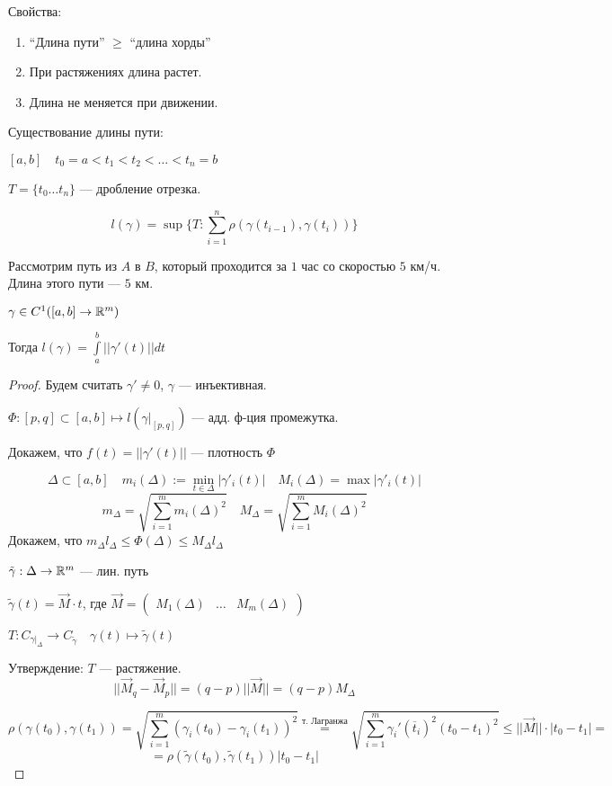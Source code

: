 Свойства:
\begin{enumerate}
    \item ``Длина пути'' $\geq$ ``длина хорды''
    \item При растяжениях длина растет.
    \item Длина не меняется при движении.
\end{enumerate}

Существование длины пути:

$[a,b] \quad t_0=a<t_1<t_2<\ldots<t_n=b$

$T=\{t_0\ldots t_n\}$ --- дробление отрезка.

$$l(\gamma)=\sup\{T : \sum\limits_{i=1}^n \rho(\gamma(t_{i-1}), \gamma(t_i))\}$$

\begin{example}
    Рассмотрим путь из $A$ в $B$, который проходится за $1$ час со скоростью $5$ км/ч. Длина этого пути --- $5$ км.
\end{example}

\begin{theorem}
    $\gamma\in C^1([a,b]\to\mathbb{R}^m)$

    Тогда $l(\gamma)=\int\limits_a^b ||\gamma'(t)||dt$
\end{theorem}
\begin{proof}
    Будем считать $\gamma'\not=0$, $\gamma$ --- инъективная.

    $\Phi: [p,q]\subset [a,b]\mapsto l(\gamma|_{[p,q]})$ --- адд. ф-ция промежутка.

    Докажем, что $f(t)=||\gamma'(t)||$ --- плотность $\Phi$

    $$\Delta\subset [a,b] \quad m_i(\Delta):=\min\limits_{t\in\Delta}|\gamma'_i(t)| \quad M_i(\Delta)=\max|\gamma'_i(t)|$$
    $$m_\Delta=\sqrt{\sum\limits_{i=1}^m m_i(\Delta)^2} \quad M_\Delta=\sqrt{\sum\limits_{i=1}^m M_i(\Delta)^2}$$
    Докажем, что $m_\Delta l_\Delta\leq \Phi(\Delta)\leq M_\Delta l_\Delta$

    $\tilde \gamma : \Delta\to\mathbb{R}^m$ --- лин. путь

    $\tilde \gamma(t)=\vec M\cdot t$, где $\vec M=\begin{pmatrix}
        M_1(\Delta) & \ldots & M_m(\Delta)
    \end{pmatrix}$

    $T: C_{\gamma|_\Delta}\to C_{\tilde \gamma} \quad \gamma(t)\mapsto \tilde \gamma(t)$

    Утверждение: $T$ --- растяжение.
    $$||\vec M_q - \vec M_p||=(q-p)||\vec M||=(q-p)M_\Delta$$

    $$\rho(\gamma(t_0), \gamma(t_1))=\sqrt{\sum\limits_{i=1}^m (\gamma_i(t_0)-\gamma_i(t_1))^2}\stackrel{\text{т. Лагранжа}}{=}\sqrt{\sum\limits_{i=1}^m \gamma_i'(\overline t_i)^2 (t_0-t_1)^2}\leq ||\vec M||\cdot|t_0-t_1|=$$
    $$=\rho(\tilde\gamma(t_0), \tilde\gamma(t_1))|t_0-t_1|$$
\end{proof}
